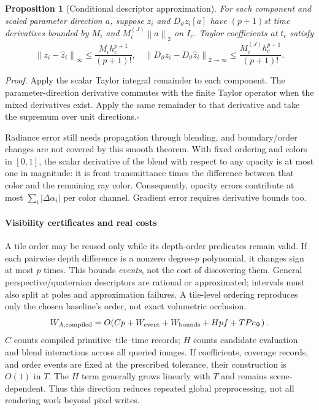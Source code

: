 \documentclass[11pt,letterpaper]{article}
\newcommand{\norm}[1]{\left\lVert#1\right\rVert}
\newcommand{\mini}[1]{\paragraph{#1}}
\newtheorem{prop}{Proposition}
\newcommand{\briefproof}[1]{\textit{Proof.} #1\hfill$\square$\par}
\begin{document}
\begin{prop}[Conditional descriptor approximation]
For each component and scaled parameter direction $a$, suppose $z_i$ and $D_\vartheta z_i[a]$ have $(p+1)$st time derivatives bounded by $M_i$ and $M_i^{(J)}\norm a_2$ on $I_c$. Taylor coefficients at $t_c$ satisfy
\begin{equation}
 \norm{z_i-\widehat z_i}_\infty\le\frac{M_ih_c^{p+1}}{(p+1)!},\quad
 \norm{D_\vartheta z_i-D_\vartheta\widehat z_i}_{2\to\infty}
 \le\frac{M_i^{(J)}h_c^{p+1}}{(p+1)!}. \label{eq:taylor}
\end{equation}
\end{prop}
\briefproof{Apply the scalar Taylor integral remainder to each component. The parameter-direction derivative commutes with the finite Taylor operator when the mixed derivatives exist. Apply the same remainder to that derivative and take the supremum over unit directions.}
Radiance error still needs propagation through blending, and boundary/order changes are not covered by this smooth theorem. With fixed ordering and colors in $[0,1]$, the scalar derivative of the blend with respect to any opacity is at most one in magnitude: it is front transmittance times the difference between that color and the remaining ray color. Consequently, opacity errors contribute at most $\sum_i|\Delta\alpha_i|$ per color channel. Gradient error requires derivative bounds too.

\mini{Visibility certificates and real costs}
A tile order may be reused only while its depth-order predicates remain valid. If each pairwise depth difference is a nonzero degree-$p$ polynomial, it changes sign at most $p$ times. This bounds \emph{events}, not the cost of discovering them. General perspective/quaternion descriptors are rational or approximated; intervals must also split at poles and approximation failures. A tile-level ordering reproduces only the chosen baseline's order, not exact volumetric occlusion.
\begin{equation}
 W_{A,\rm compiled}=O\!\left(Cp+W_{\rm event}+W_{\rm bounds}
       +Hpf+TPc_\Psi\right). \label{eq:Acompiled}
\end{equation}
$C$ counts compiled primitive--tile--time records; $H$ counts candidate evaluation and blend interactions across all queried images. If coefficients, coverage records, and order events are fixed at the prescribed tolerance, their construction is $O(1)$ in $T$. The $H$ term generally grows linearly with $T$ and remains scene-dependent. Thus this direction reduces repeated global preprocessing, not all rendering work beyond pixel writes.
\end{document}
